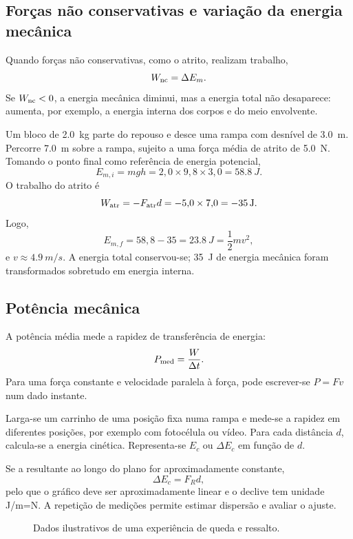 \documentclass[11pt,a4paper,oneside]{book}
\begin{document}
\subsection*{Forças não conservativas e variação da energia mecânica}
Quando forças não conservativas, como o atrito, realizam trabalho,
\[
W_{\rm nc}=\Delta E_m.
\]
Se $W_{\rm nc}<0$, a energia mecânica diminui, mas a energia total não desaparece: aumenta, por exemplo, a energia interna dos corpos e do meio envolvente.

\begin{exemplo}[title=Exemplo resolvido -- plano inclinado com atrito]
Um bloco de \SI{2.0}{kg} parte do repouso e desce uma rampa com desnível de \SI{3.0}{m}. Percorre \SI{7.0}{m} sobre a rampa, sujeito a uma força média de atrito de \SI{5.0}{N}. Tomando o ponto final como referência de energia potencial,
\[
E_{m,i}=mgh=2{,}0\times9{,}8\times3{,}0=\SI{58.8}{J}.
\]
O trabalho do atrito é
\[
W_{\rm atr}=-F_{\rm atr}d=-5{,}0\times7{,}0=\SI{-35}{J}.
\]
Logo,
\[
E_{m,f}=58{,}8-35=\SI{23.8}{J}=\frac12mv^2,
\]
e $v\approx\SI{4.9}{m/s}$. A energia total conservou-se; \SI{35}{J} de energia mecânica foram transformados sobretudo em energia interna.
\end{exemplo}

\subsection*{Potência mecânica}
A potência média mede a rapidez de transferência de energia:
\[
P_{\rm med}=\frac{W}{\Delta t}.
\]
Para uma força constante e velocidade paralela à força, pode escrever-se $P=Fv$ num dado instante.

\begin{atividade}[title=AL 1.1 -- Movimento num plano inclinado: $\Delta E_c$ e distância]
Larga-se um carrinho de uma posição fixa numa rampa e mede-se a rapidez em diferentes posições, por exemplo com fotocélula ou vídeo. Para cada distância $d$, calcula-se a energia cinética. Representa-se $E_c$ ou $\Delta E_c$ em função de $d$.

Se a resultante ao longo do plano for aproximadamente constante,
\[
\Delta E_c=F_R d,
\]
pelo que o gráfico deve ser aproximadamente linear e o declive tem unidade \si{J/m}=\si{N}. A repetição de medições permite estimar dispersão e avaliar o ajuste.
\end{atividade}

\begin{figure}[H]
\centering
{}
\caption{Dados ilustrativos de uma experiência de queda e ressalto.}
\end{figure}
\end{document}
